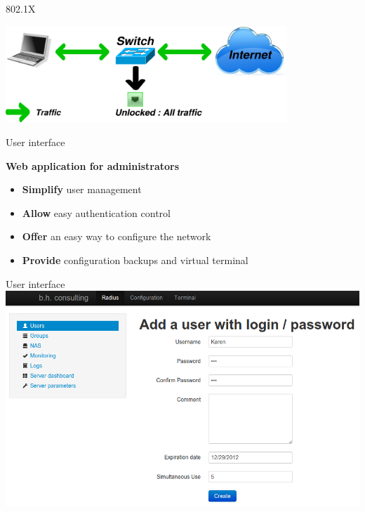 \documentclass[12pt]{beamer}
\begin{document}
\begin{frame}[noframenumbering]{802.1X}
\vfill
\begin{center}
    \includegraphics[width=300pt]{img/dot1x_7.pdf}
    \addtocounter{framenumber}{-1}
\end{center}
\vfill
\end{frame}

\begin{frame}{User interface}
    \begin{center}
    \textbf{Web application for administrators}
    \end{center}

    \pause
    \begin{itemize}[<+->]\vfill
	\item \textbf{Simplify} user management\vfill
	\item \textbf{Allow} easy authentication control\vfill
	\item \textbf{Offer} an easy way to configure the network\vfill
    	\item \textbf{Provide} configuration backups and virtual terminal\vfill
    \end{itemize}
    \vfill
\end{frame}
	
\begin{frame}{User interface}
    \includegraphics[width=\textwidth]{img/capture4.png}
\end{frame}
\end{document}
